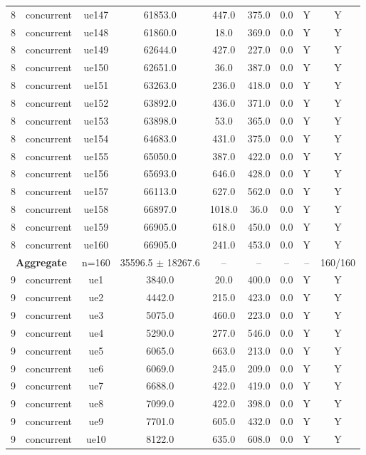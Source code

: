 \begin{table}[ht]
\begin{tabular}{|c|c|c|c|c|c|c|c|c|}
8 & concurrent & ue147 & 61853.0 & 447.0 & 375.0 & 0.0 & Y & Y \\
8 & concurrent & ue148 & 61860.0 & 18.0 & 369.0 & 0.0 & Y & Y \\
8 & concurrent & ue149 & 62644.0 & 427.0 & 227.0 & 0.0 & Y & Y \\
8 & concurrent & ue150 & 62651.0 & 36.0 & 387.0 & 0.0 & Y & Y \\
8 & concurrent & ue151 & 63263.0 & 236.0 & 418.0 & 0.0 & Y & Y \\
8 & concurrent & ue152 & 63892.0 & 436.0 & 371.0 & 0.0 & Y & Y \\
8 & concurrent & ue153 & 63898.0 & 53.0 & 365.0 & 0.0 & Y & Y \\
8 & concurrent & ue154 & 64683.0 & 431.0 & 375.0 & 0.0 & Y & Y \\
8 & concurrent & ue155 & 65050.0 & 387.0 & 422.0 & 0.0 & Y & Y \\
8 & concurrent & ue156 & 65693.0 & 646.0 & 428.0 & 0.0 & Y & Y \\
8 & concurrent & ue157 & 66113.0 & 627.0 & 562.0 & 0.0 & Y & Y \\
8 & concurrent & ue158 & 66897.0 & 1018.0 & 36.0 & 0.0 & Y & Y \\
8 & concurrent & ue159 & 66905.0 & 618.0 & 450.0 & 0.0 & Y & Y \\
8 & concurrent & ue160 & 66905.0 & 241.0 & 453.0 & 0.0 & Y & Y \\
\multicolumn{2}{|c|}{\textbf{Aggregate}} & n=160 & 35596.5 $\pm$ 18267.6 & -- & -- & -- & -- & 160/160 \\
\hline
9 & concurrent & ue1 & 3840.0 & 20.0 & 400.0 & 0.0 & Y & Y \\
9 & concurrent & ue2 & 4442.0 & 215.0 & 423.0 & 0.0 & Y & Y \\
9 & concurrent & ue3 & 5075.0 & 460.0 & 223.0 & 0.0 & Y & Y \\
9 & concurrent & ue4 & 5290.0 & 277.0 & 546.0 & 0.0 & Y & Y \\
9 & concurrent & ue5 & 6065.0 & 663.0 & 213.0 & 0.0 & Y & Y \\
9 & concurrent & ue6 & 6069.0 & 245.0 & 209.0 & 0.0 & Y & Y \\
9 & concurrent & ue7 & 6688.0 & 422.0 & 419.0 & 0.0 & Y & Y \\
9 & concurrent & ue8 & 7099.0 & 422.0 & 398.0 & 0.0 & Y & Y \\
9 & concurrent & ue9 & 7701.0 & 605.0 & 432.0 & 0.0 & Y & Y \\
9 & concurrent & ue10 & 8122.0 & 635.0 & 608.0 & 0.0 & Y & Y \\

\end{tabular}
\end{table}
